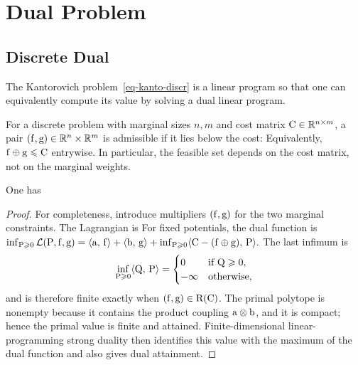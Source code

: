 \section{Dual Problem}
\label{sec-dual}
\subsection{Discrete Dual}
\label{sec-discrete-dual}
The Kantorovich problem~\eqref{eq-kanto-discr} is a linear program so that one can equivalently compute its value by solving a dual linear program.

\begin{defn}\label{def-admissible-potentials}
For a discrete problem with marginal sizes $n,m$ and cost matrix $\mathrm{C}\in\mathbb{R}^{n\times m}$, a pair $(\mathrm{f},\mathrm{g})\in\mathbb{R}^n\times\mathbb{R}^m$ is admissible if it lies below the cost:
Equivalently, $\mathrm{f}\oplus\mathrm{g}\leqslant\mathrm{C}$ entrywise. In particular, the feasible set depends on the cost matrix, not on the marginal weights.
\end{defn}
\begin{prop}\label{prop-duality-discr}
One has
\end{prop}
\begin{proof}
For completeness, introduce multipliers $(\mathrm{f},\mathrm{g})$ for the two marginal constraints. The Lagrangian is
For fixed potentials, the dual function is \(\inf_{\mathrm{P}\geqslant0}\mathcal L(\mathrm{P},\mathrm{f},\mathrm{g}) =\langle \mathrm{a},\,\mathrm{f}\rangle+\langle \mathrm{b},\,\mathrm{g}\rangle +\inf_{\mathrm{P}\geqslant0}\langle \mathrm{C}-(\mathrm{f}\oplus\mathrm{g}),\,\mathrm{P}\rangle.\)
The last infimum is
\[
\inf_{\mathrm{P}\geqslant0}\langle \mathrm{Q},\,\mathrm{P}\rangle
=
\begin{cases}
0 & \text{if }\mathrm{Q}\geqslant0,\\
-\infty & \text{otherwise},
\end{cases}
\]
and is therefore finite exactly when $(\mathrm{f},\mathrm{g})\in\mathrm{R}(\mathrm{C})$. The primal polytope is nonempty because it contains the product coupling $\mathrm{a}\otimes\mathrm{b}$, and it is compact; hence the primal value is finite and attained. Finite-dimensional linear-programming strong duality then identifies this value with the maximum of the dual function and also gives dual attainment.
\end{proof}
